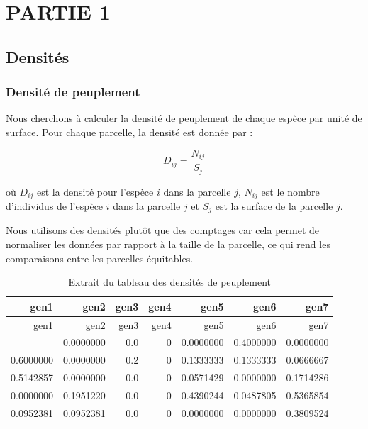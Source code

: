 \documentclass[
]{article}
\begin{document}
\hypertarget{partie-1}{%
\section{PARTIE 1}\label{partie-1}}

\hypertarget{densituxe9s}{%
\subsection{Densités}\label{densituxe9s}}

\hypertarget{densituxe9-de-peuplement}{%
\subsubsection{Densité de peuplement}\label{densituxe9-de-peuplement}}

Nous cherchons à calculer la densité de peuplement de chaque espèce par
unité de surface. Pour chaque parcelle, la densité est donnée par :

\[
D_{ij} = \frac{N_{ij}}{S_{j}}
\]

où \(D_{ij}\) est la densité pour l'espèce \(i\) dans la parcelle \(j\),
\(N_{ij}\) est le nombre d'individus de l'espèce \(i\) dans la parcelle
\(j\) et \(S_{j}\) est la surface de la parcelle \(j\).

Nous utilisons des densités plutôt que des comptages car cela permet de
normaliser les données par rapport à la taille de la parcelle, ce qui
rend les comparaisons entre les parcelles équitables.

\begin{longtable}[]{@{}rrrrrrr@{}}
\caption{Extrait du tableau des densités de peuplement}\tabularnewline
\toprule\noalign{}
gen1 & gen2 & gen3 & gen4 & gen5 & gen6 & gen7 \\
\midrule\noalign{}
\endfirsthead
\toprule\noalign{}
gen1 & gen2 & gen3 & gen4 & gen5 & gen6 & gen7 \\
\midrule\noalign{}
\endhead
\bottomrule\noalign{}
\endlastfoot
0.0000000 & 0.0000000 & 0.0 & 0 & 0.0000000 & 0.4000000 & 0.0000000 \\
0.6000000 & 0.0000000 & 0.2 & 0 & 0.1333333 & 0.1333333 & 0.0666667 \\
0.5142857 & 0.0000000 & 0.0 & 0 & 0.0571429 & 0.0000000 & 0.1714286 \\
0.0000000 & 0.1951220 & 0.0 & 0 & 0.4390244 & 0.0487805 & 0.5365854 \\
0.0952381 & 0.0952381 & 0.0 & 0 & 0.0000000 & 0.0000000 & 0.3809524 \\
\end{longtable}
\end{document}
